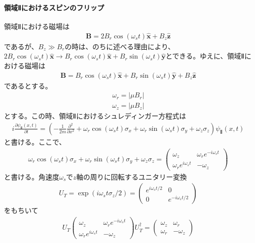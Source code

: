 \paragraph{領域Ⅱにおけるスピンのフリップ}
領域Ⅱにおける磁場は
\begin{align}
\bm{B}=2B_{r}\cos(\omega_{s}t)\bm{\hat{x}}+B_{z}\bm{\hat{z}}
\end{align}
であるが、$B_{z} \gg B_{r}$の時は、のちに述べる理由により、$2B_{r}\cos(\omega_{s}t)\bm{\hat{x}} \to  B_{r}\cos(\omega_{s}t)\bm{\hat{x}}+B_{r}\sin(\omega_{s}t)\bm{\hat{y}}$とできる。ゆえに、領域Ⅱにおける磁場は
\begin{align}
\bm{B}=B_{r}\cos(\omega_{s}t)\bm{\hat{x}}+B_{r}\sin(\omega_{s}t)\bm{\hat{y}}+B_{z}\bm{\hat{z}}
\end{align}
であるとする。
\begin{align}
\omega_{r}=|{\mu}B_{r}|
\end{align}
\begin{align}
\omega_{z}=|{\mu}B_{z}|
\end{align}
とする。この時、領域Ⅱにおけるシュレディンガー方程式は
\begin{align}
i\frac{\partial {\psi}_{Ⅱ}(x,t)}{\partial t}=\left(-\frac{1}{2m}\frac{\partial^2}{\partial x^2}+\omega_{r}\cos(\omega_{s}t){\sigma}_{x}+\omega_{r}\sin(\omega_{s}t){\sigma}_{y}+\omega_{z}{\sigma}_{z}\right){\psi}_{Ⅱ}(x,t)
\end{align}
と書ける。ここで、
\begin{align}
\omega_{r}\cos(\omega_{s}t){\sigma}_{x}+\omega_{r}\sin(\omega_{s}t){\sigma}_{y}+\omega_{z}{\sigma}_{z}=
\begin{pmatrix}
\omega_{z} &\omega_{r}e^{-i\omega_{s}t} \\
\omega_{r}e^{i\omega_{s}t} &-\omega_{z}
\end{pmatrix}
\end{align}
$と書ける。角速度\omega_{s}でz軸の周りに回転するユニタリー変換$
\begin{align}
U_{T}=\exp(i\omega_{s}t{\sigma}_{z}/2)=
\begin{pmatrix}
e^{i\omega_{s}t/2} &0 \\
0 &e^{-i\omega_{s}t/2}
\end{pmatrix}
\end{align}
をもちいて
\begin{align}
U_{T}\begin{pmatrix}
\omega_{z} &\omega_{r}e^{-i\omega_{s}t} \\
\omega_{r}e^{i\omega_{s}t} &-\omega_{z}
\end{pmatrix}U_{T}^{\dagger}=
\begin{pmatrix}
\omega_{z} &\omega_{r} \\
\omega_{r} &-\omega_{z}
\end{pmatrix}
\end{align}
